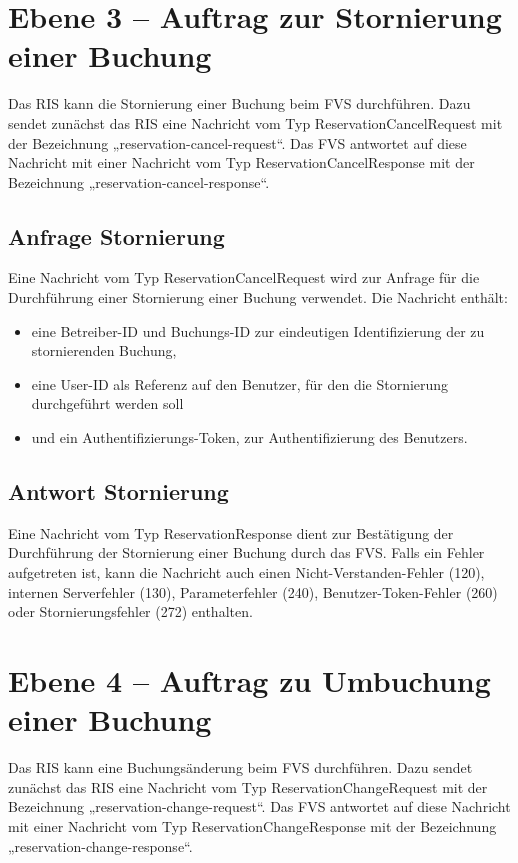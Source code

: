 


\section{Ebene 3 -- Auftrag zur Stornierung einer Buchung}
Das RIS kann die Stornierung einer Buchung beim FVS durchführen. Dazu sendet zunächst das RIS eine Nachricht vom Typ ReservationCancelRequest mit der Bezeichnung „reservation-cancel-request“. Das FVS antwortet auf diese Nachricht mit einer Nachricht vom Typ ReservationCancelResponse mit der Bezeichnung „reservation-cancel-response“.



\subsection{Anfrage Stornierung}
Eine Nachricht vom Typ ReservationCancelRequest wird zur Anfrage für die Durchführung einer Stornierung einer Buchung verwendet. Die Nachricht enthält:
\begin{itemize}
\item eine Betreiber-ID und Buchungs-ID zur eindeutigen Identifizierung der zu stornierenden Buchung,
\item eine User-ID als Referenz auf den Benutzer, für den die Stornierung durchgeführt werden soll
\item und ein Authentifizierungs-Token, zur Authentifizierung des Benutzers.
\end{itemize}



\subsection{Antwort Stornierung}
Eine Nachricht vom Typ ReservationResponse dient zur Bestätigung der Durchführung der Stornierung einer Buchung durch das FVS. Falls ein Fehler aufgetreten ist, kann die Nachricht auch einen Nicht-Verstanden-Fehler (120), internen Serverfehler (130), Parameterfehler (240), Benutzer-Token-Fehler (260) oder Stornierungsfehler (272) enthalten.




\section{Ebene 4 -- Auftrag zu Umbuchung einer Buchung}
Das RIS kann eine Buchungsänderung beim FVS durchführen. Dazu sendet zunächst das RIS eine Nachricht vom Typ ReservationChangeRequest mit der Bezeichnung „reservation-change-request“. Das FVS antwortet auf diese Nachricht mit einer Nachricht vom Typ ReservationChangeResponse mit der Bezeichnung „reservation-change-response“.

